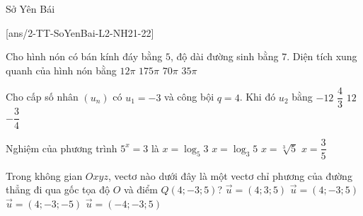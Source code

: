 \begin{name}
	{\tenchude}
	{\tendethi}
	{Sở Yên Bái}
	{\thoigian}
\end{name}
[ans/2-TT-SoYenBai-L2-NH21-22]


\begin{ex}%
Cho hình nón có bán kính đáy bằng $5$, độ dài đường sinh bằng $7$. Diện tích xung quanh của hình nón bằng
\choice
{$12\pi$}
{$175\pi$}
{$70\pi$}
{\True $35\pi$}
\end{ex}

\begin{ex}%
Cho cấp số nhân $(u_n)$ có $u_1=-3$ và công bội $q=4$. Khi đó $u_2$ bằng
\choice
{\True $-12$}
{$\dfrac{4}{3}$}
{$12$}
{$-\dfrac{3}{4}$}
\end{ex}



\begin{ex}%
Nghiệm của phương trình $5^x=3$ là
\choice
{\True $x=\log_5 3$}
{$x=\log_3 5$}
{$x=\sqrt[3]{5}$}
{$x=\dfrac{3}{5}$}
\end{ex}



\begin{ex}%
Trong không gian $Oxyz$, vectơ nào dưới đây là một vectơ chỉ phương của đường thẳng đi qua gốc tọa độ $O$ và điểm $Q(4;-3;5)$?
\choice
{$\overrightarrow{u}=(4;3;5)$}
{\True $\overrightarrow{u}=(4;-3;5)$}
{$\overrightarrow{u}=(4;-3;-5)$}
{$\overrightarrow{u}=(-4;-3;5)$}
\end{ex}



